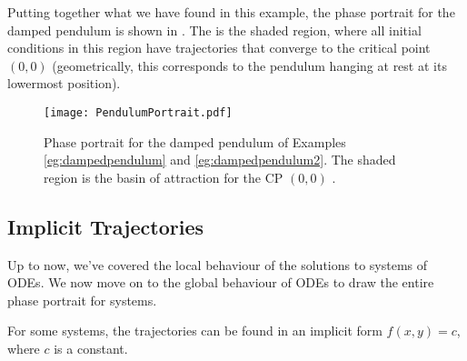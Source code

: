 \begin{eg}
	Putting together what we have found in this example, the phase portrait for the damped pendulum is shown in . The  is the shaded region, where all initial conditions in this region have trajectories that converge to the critical point $(0,0)$ (geometrically, this corresponds to the pendulum hanging at rest at its lowermost position).
\end{eg}

\begin{figure}[!ht]
	\centering
	\texttt{[image: PendulumPortrait.pdf]}
	\caption{Phase portrait for the damped pendulum of Examples \ref{eg:dampedpendulum} and \ref{eg:dampedpendulum2}. The shaded region is the basin of attraction for the CP $(0,0)$ \cite[Figure 9.3.5]{boyce}.}
	\label{fig:pendulumportrait}
\end{figure}

\subsection{Implicit Trajectories}\label{sec:implicittraj}

Up to now, we've covered the local behaviour of the solutions to systems of ODEs. We now move on to the global behaviour of ODEs to draw the entire phase portrait for systems.

For some systems, the trajectories can be found in an implicit form $f(x,y) = c$, where $c$ is a constant.

